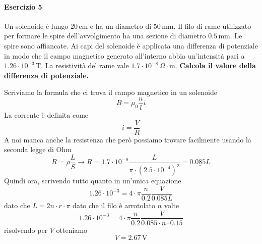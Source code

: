 \paragraph{Esercizio 5}
Un solenoide è lungo $20\,\text{cm}$ e ha un diametro di $50\,\text{mm}$. Il filo di rame 
utilizzato per formare le spire dell'avvolgimento ha una sezione di diametro $0.5\,\text{mm}$.
Le spire sono affiancate. Ai capi del solenoide è applicata una differenza di potenziale in
modo che il campo magnetico generato all'interno abbia un'intensità pari a $1.26\cdot10^{-3}\,
\text{T}$. La resistività del rame vale $1.7\cdot10^{-8}\,\Omega\cdot\text{m}$. \textbf{Calcola
il valore della differenza di potenziale.} 
\divisor

Scriviamo la formula che ci trova il campo magnetico in un solenoide
\begin{equation*}
  B = \mu_0 \frac{n}{l}i
\end{equation*}
La corrente è definita come
\begin{equation*}
  i = \frac{V}{R}
\end{equation*}
A noi manca anche la resistenza che però possiamo trovare facilmente usando la seconda legge di
Ohm
\begin{equation*}
  R = \rho \frac{L}{S} \rightarrow R = 1.7\cdot10^{-8} \frac{L}{\pi\cdot (2.5\cdot10^{-4})^2} =
  \underline{0.085L} 
\end{equation*}
Quindi ora, scrivendo tutto quanto in un'unica equazione
\begin{equation*}
  1.26\cdot10^{-3} = 4\cdot\pi \frac{n}{0.2}\frac{V}{0.085L}
\end{equation*}
dato che $L = 2n\cdot r\cdot\pi$ dato che il filo è arrotolato $n$ volte
\begin{equation*}
  1.26\cdot10^{-3} = 4\cdot\pi \frac{n}{0.2}\frac{V}{0.085\cdot n\cdot 0.15}
\end{equation*}
risolvendo per $V$ otteniamo
\begin{equation*}
  V = \boxed{2.67\,\text{V}}
\end{equation*}

